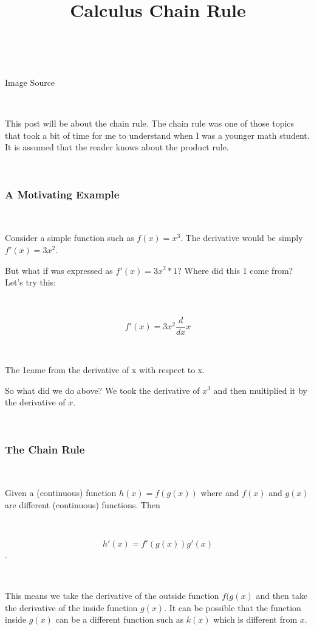 \documentclass[]{article}
\title{Calculus Chain Rule}
\author{}
\date{}
\begin{document}
\maketitle

~

Image Source

~

This post will be about the chain rule. The chain rule was one of those
topics that took a bit of time for me to understand when I was a younger
math student. It is assumed that the reader knows about the product
rule.

~

\hypertarget{a-motivating-example}{%
\subsubsection{A Motivating Example}\label{a-motivating-example}}

~

Consider a simple function such as \(f(x) = x^3\). The derivative would
be simply \(f'(x) = 3x^2\).

But what if was expressed as \(f'(x) = 3x^2 * 1\)? Where did this 1 come
from? Let's try this:

~

\[f'(x) = 3x^2 \dfrac{d}{dx} x\]

~

The 1came from the derivative of x with respect to x.

So what did we do above? We took the derivative of \(x^3\) and then
multiplied it by the derivative of \(x\).

~

\hypertarget{the-chain-rule}{%
\subsubsection{The Chain Rule}\label{the-chain-rule}}

~

Given a (continuous) function \(h(x) = f(g(x))\) where and \(f(x)\) and
\(g(x)\) are different (continuous) functions. Then

~

\[\displaystyle h'(x) = f'( g(x) ) g'(x)\].

~

This means we take the derivative of the outside function \(f(g(x)\) and
then take the derivative of the inside function \(g(x)\). It can be
possible that the function inside \(g(x)\) can be a different function
such as \(k(x)\) which is different from \(x\).
\end{document}
